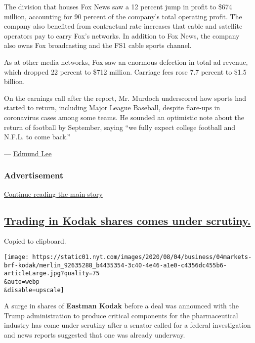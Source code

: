 The division that houses Fox News saw a 12 percent jump in profit to
\$674 million, accounting for 90 percent of the company's total
operating profit. The company also benefited from contractual rate
increases that cable and satellite operators pay to carry Fox's
networks. In addition to Fox News, the company also owns Fox
broadcasting and the FS1 cable sports channel.

As at other media networks, Fox saw an enormous defection in total ad
revenue, which dropped 22 percent to \$712 million. Carriage fees rose
7.7 percent to \$1.5 billion.

On the earnings call after the report, Mr. Murdoch underscored how
sports had started to return, including Major League Baseball, despite
flare-ups in coronavirus cases among some teams. He sounded an
optimistic note about the return of football by September, saying ``we
fully expect college football and N.F.L. to come back.''

--- \href{https://www.nytimes.com/by/edmund-lee}{Edmund Lee}

\hypertarget{advertisement}{%
\subsubsection{Advertisement}\label{advertisement}}

\protect\hyperlink{after-dfp-ad-mid1}{Continue reading the main story}

\hypertarget{trading-in-kodak-shares-comes-under-scrutiny}{%
\subsection{\texorpdfstring{\protect\hyperlink{trading-in-kodak-shares-comes-under-scrutiny}{Trading
in Kodak shares comes under
scrutiny.}}{Trading in Kodak shares comes under scrutiny.}}\label{trading-in-kodak-shares-comes-under-scrutiny}}

Copied to clipboard.

\texttt{[image: https://static01.nyt.com/images/2020/08/04/business/04markets-brf-kodak/merlin\_92635288\_b4435354-3c40-4e46-a1e0-c4356dc455b6-articleLarge.jpg?quality=75\\\&auto=webp\\\&disable=upscale]}

A surge in shares of \textbf{Eastman Kodak} before a deal was announced
with the Trump administration to produce critical components for the
pharmaceutical industry has come under scrutiny after a senator called
for a federal investigation and news reports suggested that one was
already underway.

